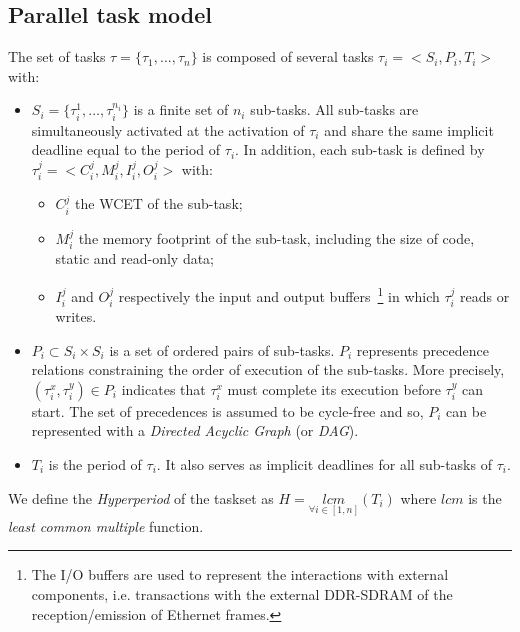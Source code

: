 \documentclass[main.tex]{subfiles}
\begin{document}
\subsection{Parallel task model}
The set of tasks $\tau = \{ \tau_1 , \ldots , \tau_n \}$ is composed of several tasks $\tau_i = < S_i , P_i , T_i >$ with:
\begin{itemize}
    \item $S_i = \{ \tau_i^1 , \ldots , \tau_i^{n_i} \}$ is a finite set of $n_i$ sub-tasks. All sub-tasks are simultaneously activated at the activation of $\tau_i$ and share the same implicit deadline equal to the period of $\tau_i$. In addition, each sub-task is defined by $\tau_i^j = < C_i^j , M_i^j , I_i^j , O_i^j >$ with:
        \begin{itemize}
            \item $C_i^j$ the WCET of the sub-task;
            \item $M_i^j$ the memory footprint of the sub-task, including the size of code, static and read-only data;
            \item $I_i^j$ and $O_i^j$ respectively the input and output buffers~\footnote{The I/O buffers are used to represent the interactions with external components, i.e. transactions with the external DDR-SDRAM of the reception/emission of Ethernet frames.} in which $\tau_i^j$ reads or writes.
        \end{itemize}

    \item $P_i \subset S_i \times S_i$ is a set of ordered pairs of sub-tasks. $P_i$ represents precedence relations constraining the order of execution of the sub-tasks. More precisely, $(\tau_i^x , \tau_i^y) \in P_i$ indicates that $\tau_i^x$ must complete its execution before $\tau_i^y$ can start. The set of precedences is assumed to be cycle-free and so, $P_i$ can be represented with a \emph{Directed Acyclic Graph} (or \emph{DAG}).

    \item $T_i$ is the period of $\tau_i$. It also serves as implicit deadlines for all sub-tasks of $\tau_i$.
\end{itemize}

We define the \emph{Hyperperiod} of the taskset as $H = \underset{\forall i \in [1 , n]}{lcm} ( T_i )$ where $lcm$ is the \emph{least common multiple} function.
\end{document}
